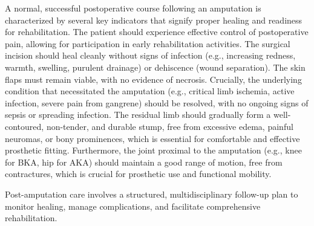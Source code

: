 A normal, successful postoperative course following an amputation is characterized by several key indicators that signify proper healing and readiness for rehabilitation. The patient should experience effective control of postoperative pain, allowing for participation in early rehabilitation activities. The surgical incision should heal cleanly without signs of infection (e.g., increasing redness, warmth, swelling, purulent drainage) or dehiscence (wound separation). The skin flaps must remain viable, with no evidence of necrosis. Crucially, the underlying condition that necessitated the amputation (e.g., critical limb ischemia, active infection, severe pain from gangrene) should be resolved, with no ongoing signs of sepsis or spreading infection. The residual limb should gradually form a well-contoured, non-tender, and durable stump, free from excessive edema, painful neuromas, or bony prominences, which is essential for comfortable and effective prosthetic fitting. Furthermore, the joint proximal to the amputation (e.g., knee for BKA, hip for AKA) should maintain a good range of motion, free from contractures, which is crucial for prosthetic use and functional mobility.

Post-amputation care involves a structured, multidisciplinary follow-up plan to monitor healing, manage complications, and facilitate comprehensive rehabilitation.

